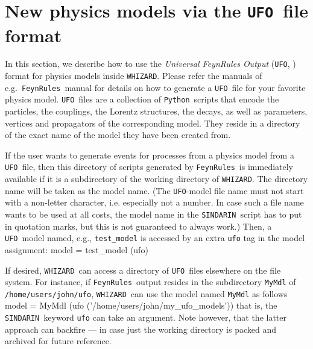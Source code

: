 \documentclass[12pt]{book}
\newenvironment{Code}%
  {\begingroup\footnotesize
   \quote
   \Verbatim[frame=single]}%
  {\endVerbatim
   \endquote
   \endgroup\noindent}
\newcommand{\ttt}[1]{\texttt{#1}}
\newcommand{\whizard}{\ttt{WHIZARD}}
\newcommand{\FeynRules}{\ttt{FeynRules}}
\newcommand{\UFO}{\ttt{UFO}}
\newcommand{\sindarin}{\ttt{SINDARIN}}
\newcommand{\python}{\ttt{Python}}
\begin{document}

\section{New physics models via the \UFO\ file format}
\label{sec:ufo}

In this section, we describe how to use the {\em Universal FeynRules
Output} (\UFO, \cite{Degrande:2011ua}) format for physics models
inside \whizard. Please refer the manuals of e.g.~\FeynRules\ manual
for details on how to generate a \UFO\ file for your favorite physics
model. \UFO\ files are a collection of \python\ scripts that
encode the particles, the couplings, the Lorentz structures, the
decays, as well as parameters, vertices and propagators of the
corresponding model. They reside in a directory of the exact name of
the model they have been created from.

If the user wants to generate events for processes from a physics
model from a \UFO\ file, then this directory of scripts generated by
\FeynRules\ is immediately available if it is a subdirectory of the working
directory of \whizard.  The directory name will be taken as the model
name. (The \UFO-model file name must not start with a
  non-letter character, i.e. especially not a number.  In case such a
  file name wants to be used at all costs, the model name in the
  \sindarin\ script has to put in quotation marks, but this is not
  guaranteed to always work.)  Then, a \UFO\ model named, e.g.,
\ttt{test\_model} is accessed by an extra \ttt{ufo} tag in the model
assignment:
\begin{Code}
  model = test_model (ufo)
\end{Code}

If desired, \whizard\ can access a directory of \UFO\ files elsewhere
on the file system.  For instance, if \FeynRules\ output resides in
the subdirectory \ttt{MyMdl} of
\ttt{/home/users/john/ufo}, \whizard\ can use the model
named \ttt{MyMdl} as follows
\begin{Code}
  model = MyMdl (ufo ('/home/users/john/my_ufo_models'))
\end{Code}
that is, the \sindarin\ keyword \ttt{ufo} can take an argument.  Note
however, that the latter approach can backfire --- in case just the working
directory is packed and archived for future reference.




\clearpage
\end{document}
